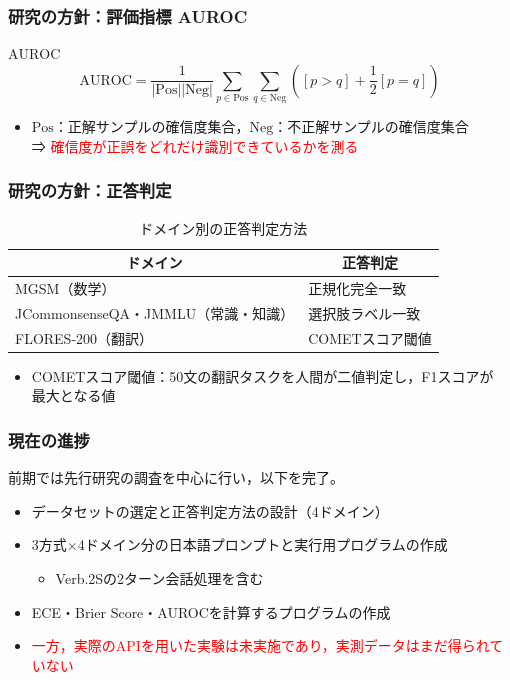\documentclass[dvipdfmx]{beamer}
\begin{document}
\begin{frame}
\frametitle{研究の方針：評価指標 AUROC}
\begin{block}{$\mathrm{AUROC}$}
\[
\mathrm{AUROC} = \frac{1}{|\mathrm{Pos}||\mathrm{Neg}|} \sum_{p \in \mathrm{Pos}} \sum_{q \in \mathrm{Neg}}
\left( [p > q] + \frac{1}{2}[p = q] \right)
\]
\end{block}
\begin{itemize}
	\item $\mathrm{Pos}$：正解サンプルの確信度集合，$\mathrm{Neg}$：不正解サンプルの確信度集合
	\\⇒ \textcolor{red}{確信度が正誤をどれだけ識別できているかを測る}
\end{itemize}
\end{frame}

\begin{frame}
\frametitle{研究の方針：正答判定}
\begin{table}
\centering
\caption{ドメイン別の正答判定方法}
\begin{tabular}{|l|l|} \hline
\multicolumn{1}{|c|}{ドメイン} & \multicolumn{1}{c|}{正答判定} \\ \hline
MGSM（数学） & 正規化完全一致 \\ \hline
JCommonsenseQA・JMMLU（常識・知識） & 選択肢ラベル一致 \\ \hline
FLORES-200（翻訳） & COMETスコア閾値 \\ \hline
\end{tabular}
\end{table}
\begin{itemize}
	\item COMETスコア閾値：50文の翻訳タスクを人間が二値判定し，F1スコアが
	      最大となる値
\end{itemize}
\end{frame}

\begin{frame}
\frametitle{現在の進捗}
前期では先行研究の調査を中心に行い，以下を完了。
\begin{itemize}
	\item データセットの選定と正答判定方法の設計（4ドメイン）
	\vspace{5pt}
	\item 3方式×4ドメイン分の日本語プロンプトと実行用プログラムの作成
	\begin{itemize}
		\item Verb.2Sの2ターン会話処理を含む
	\end{itemize}
	\vspace{5pt}
	\item ECE・Brier Score・AUROCを計算するプログラムの作成
	\vspace{10pt}
	\item \textcolor{red}{一方，実際のAPIを用いた実験は未実施であり，実測データはまだ得られていない}
\end{itemize}
\end{frame}
\end{document}

